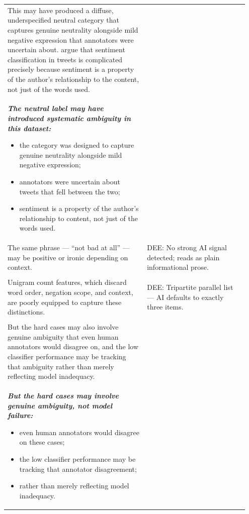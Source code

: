 \documentclass[11pt]{article}
\begin{document}
\begin{longtable}{|p{0.55\linewidth}|p{0.40\linewidth}|}
\hline
\rule{0pt}{3.5cm} & \\
\hline
This may have produced a diffuse, underspecified neutral category that captures genuine neutrality alongside mild negative expression that annotators were uncertain about. argue that sentiment classification in tweets is complicated precisely because sentiment is a property of the author's relationship to the content, not just of the words used. & \\[2pt]
\hline
{\bfseries\itshape The neutral label may have introduced systematic ambiguity in this dataset:
\begin{itemize}[leftmargin=*,topsep=2pt,itemsep=1pt,parsep=0pt]
  \item the category was designed to capture genuine neutrality alongside mild negative expression;
  \item annotators were uncertain about tweets that fell between the two;
  \item sentiment is a property of the author's relationship to content, not just of the words used.
\end{itemize}}\vspace{2em} & \\
\hline
The same phrase --- ``not bad at all'' --- may be positive or ironic depending on context. & DEE: No strong AI signal detected; reads as plain informational prose. \\[2pt]
\hline
\rule{0pt}{3.5cm} & \\
\hline
Unigram count features, which discard word order, negation scope, and context, are poorly equipped to capture these distinctions. & DEE: Tripartite parallel list --- AI defaults to exactly three items. \\[2pt]
\hline
\rule{0pt}{3.5cm} & \\
\hline
But the hard cases may also involve genuine ambiguity that even human annotators would disagree on, and the low classifier performance may be tracking that ambiguity rather than merely reflecting model inadequacy. & \\[2pt]
\hline
{\bfseries\itshape But the hard cases may involve genuine ambiguity, not model failure:
\begin{itemize}[leftmargin=*,topsep=2pt,itemsep=1pt,parsep=0pt]
  \item even human annotators would disagree on these cases;
  \item the low classifier performance may be tracking that annotator disagreement;
  \item rather than merely reflecting model inadequacy.

\end{itemize}}
\end{longtable}
\end{document}
